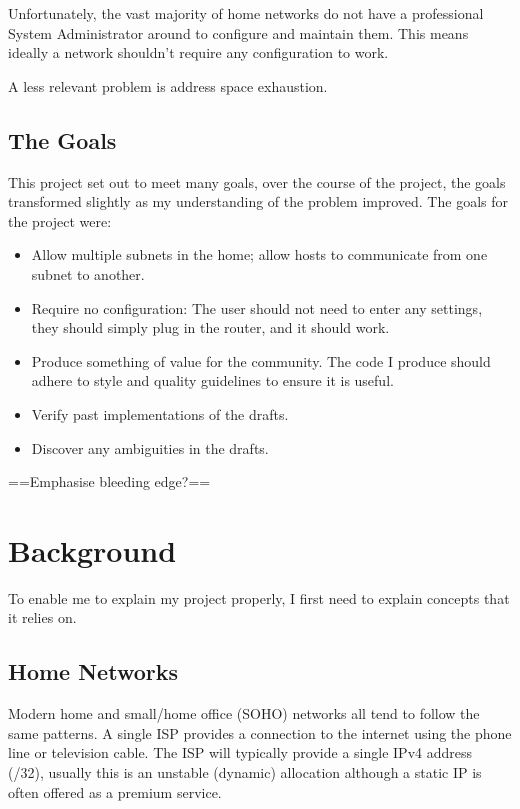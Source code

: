 \documentclass[12pt]{report}
\begin{document}
Unfortunately, the vast majority of home networks do not have a professional
System Administrator around to configure and maintain them. This means ideally
a network shouldn't require any configuration to work.

A less relevant problem is 
address space exhaustion. 

\section{The Goals}
This project set out to meet many goals, over the course of the project, the
goals transformed slightly as my understanding of the problem improved. The
goals for the project were:
\begin{itemize}
\item Allow multiple subnets in the home; allow hosts to communicate from one
  subnet to another.
\item Require no configuration: The user should not need to enter any settings,
  they should simply plug in the router, and it should work.
\item Produce something of value for the community. The code I produce should
  adhere to style and quality guidelines to ensure it is useful.
\item Verify past implementations of the drafts.
\item Discover any ambiguities in the drafts.
\end{itemize}

==Emphasise bleeding edge?==

\chapter{Background}
To enable me to explain my project properly, I first need to explain concepts
that it relies on.

\section{Home Networks}
Modern home and small/home office (SOHO)  networks all tend to follow the same patterns. A single ISP
provides a connection to the internet using the phone line or television cable.
The ISP will typically provide a single IPv4 address (/32), usually this is an
unstable (dynamic) allocation although a static IP is often offered as a
premium service. 
\end{document}
